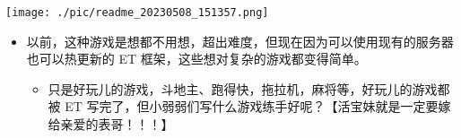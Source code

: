 \documentclass[9pt, b5paper]{article}
\begin{document}
\begin{center}
\texttt{[image: ./pic/readme\_20230508\_151357.png]}
\end{center}
\begin{itemize}
\item 以前，这种游戏是想都不用想，超出难度，但现在因为可以使用现有的服务器也可以热更新的 ET 框架，这些想对复杂的游戏都变得简单。
\begin{itemize}
\item 只是好玩儿的游戏，斗地主、跑得快，拖拉机，麻将等，好玩儿的游戏都被 ET 写完了，但小弱弱们写什么游戏练手好呢？【活宝妹就是一定要嫁给亲爱的表哥！！！】
\end{itemize}
\end{itemize}
\end{document}
